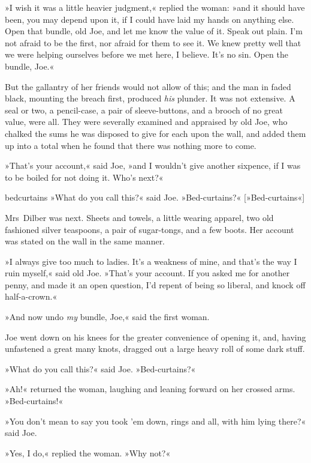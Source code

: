 »I wish it was a little heavier judgment,« replied the woman: »and it should have been, you may depend upon it, if I could have laid my hands on anything else. Open that bundle, old Joe, and let me know the value of it. Speak out plain. I'm not afraid to be the first, nor afraid for them to see it. We knew pretty well that we were helping ourselves before we met here, I believe. It's no sin. Open the bundle, Joe.«

But the gallantry of her friends would not allow of this; and the man in faded black, mounting the breach first, produced \textit{his} plunder. It was not extensive. A seal or two, a pencil-case, a pair of sleeve-buttons, and a brooch of no great value, were all. They were severally examined and appraised by old Joe, who chalked the sums he was disposed to give for each upon the wall, and added them up into a total when he found that there was nothing more to come.

»That's your account,« said Joe, »and I wouldn't give another sixpence, if I was to be boiled for not doing it. Who's next?«

\begin{colorbigpic}
	[1.15]
	{bedcurtains}
	{»What do you call this?« said Joe. »Bed-curtains?«}
	[»Bed-curtains«]
\end{colorbigpic}

Mrs~Dilber was next. Sheets and towels, a little wearing apparel, two old fashioned silver teaspoons, a pair of sugar-tongs, and a few boots. Her account was stated on the wall in the same manner.

»I always give too much to ladies. It's a weakness of mine, and that's the way I ruin myself,« said old Joe. »That's your account. If you asked me for another penny, and made it an open question, I'd repent of being so liberal, and knock off half-a-crown.«

»And now undo \textit{my} bundle, Joe,« said the first woman.

Joe went down on his knees for the greater convenience of opening it, and, having unfastened a great many knots, dragged out a large heavy roll of some dark stuff.

»What do you call this?« said Joe. »Bed-curtains?«

»Ah!« returned the woman, laughing and leaning forward on her crossed arms. »Bed-curtains!«

»You don't mean to say you took 'em down, rings and all, with him lying there?« said Joe.

»Yes, I do,« replied the woman. »Why not?«

